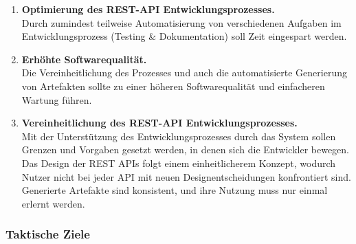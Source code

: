 \begin{enumerate}
	\item \textbf{Optimierung des REST-API Entwicklungsprozesses.} \\
	Durch zumindest teilweise Automatisierung von verschiedenen Aufgaben im Entwicklungsprozess (Testing \& Dokumentation) soll Zeit eingespart werden.
	\item \textbf{Erhöhte Softwarequalität.} \\
	Die Vereinheitlichung des Prozesses und auch die automatisierte Generierung von Artefakten sollte zu einer höheren Softwarequalität und einfacheren Wartung führen.
	\item \textbf{Vereinheitlichung des REST-API Entwicklungsprozesses.} \\
	Mit der Unterstützung des Entwicklungsprozesses durch das System sollen Grenzen und Vorgaben gesetzt werden, in denen sich die Entwickler bewegen. Das Design der REST APIs folgt einem einheitlicherem Konzept, wodurch Nutzer nicht bei jeder API mit neuen Designentscheidungen konfrontiert sind. Generierte Artefakte sind konsistent, und ihre Nutzung muss nur einmal erlernt werden.	
\end{enumerate}


\subsubsection{Taktische Ziele}

